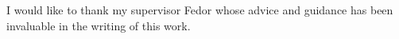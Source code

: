 
\begin{acknowledgements}      


I would like to thank my supervisor Fedor whose advice and guidance has been invaluable in the writing of this work. 


\end{acknowledgements}
